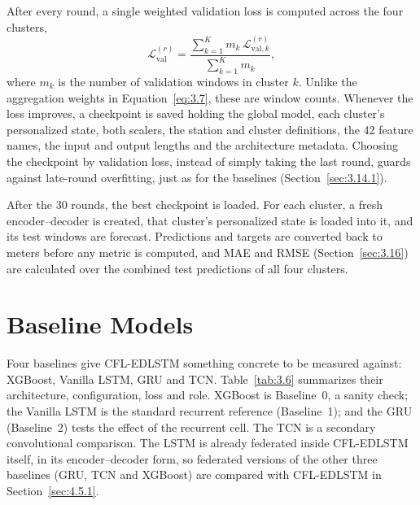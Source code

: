 After every round, a single weighted validation loss is computed across the four
clusters,
\begin{equation}
  \mathcal{L}_{\mathrm{val}}^{(r)} = \frac{\sum_{k=1}^{K} m_k\, \mathcal{L}_{\mathrm{val},k}^{(r)}}{\sum_{k=1}^{K} m_k},
  \label{eq:3.8}
\end{equation}
where $m_k$ is the number of validation windows in cluster $k$. Unlike the
aggregation weights in Equation~\eqref{eq:3.7}, these are window counts.
Whenever the loss improves, a checkpoint is saved holding the global model, each
cluster's personalized state, both scalers, the station and cluster definitions,
the 42 feature names, the input and output lengths and the architecture
metadata. Choosing the checkpoint by validation loss, instead of simply taking
the last round, guards against late-round overfitting, just as for the baselines
(Section~\ref{sec:3.14.1}).

After the 30 rounds, the best checkpoint is loaded. For each cluster, a fresh
encoder--decoder is created, that cluster's personalized state is loaded into
it, and its test windows are forecast. Predictions and targets are converted
back to meters before any metric is computed, and MAE and RMSE
(Section~\ref{sec:3.16}) are calculated over the combined test predictions of all
four clusters.

\section{Baseline Models}
\label{sec:3.13}

Four baselines give CFL-EDLSTM something concrete to be measured against:
XGBoost, Vanilla LSTM, GRU and TCN. Table~\ref{tab:3.6} summarizes their
architecture, configuration, loss and role. XGBoost is Baseline~0, a sanity
check; the Vanilla LSTM is the standard recurrent reference (Baseline~1); and
the GRU (Baseline~2) tests the effect of the recurrent cell. The TCN is a
secondary convolutional comparison. The LSTM is already federated inside
CFL-EDLSTM itself, in its encoder--decoder form, so federated versions of the
other three baselines (GRU, TCN and XGBoost) are compared with CFL-EDLSTM in
Section~\ref{sec:4.5.1}.

